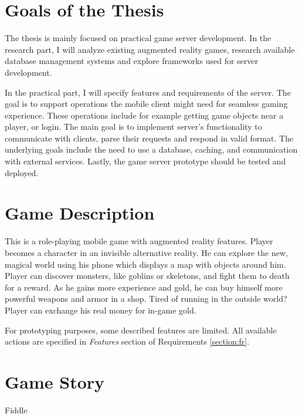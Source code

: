 \section{Goals of the Thesis}
The thesis is mainly focused on practical game server development. In the research part, I will analyze existing augmented reality games, research available database management systems and explore frameworks used for server development.

In the practical part, I will specify features and requirements of the server. The goal is to support operations the mobile client might need for seamless gaming experience. These operations include for example getting game objects near a player, or login. The main goal is to implement server's functionality to communicate with clients, parse their requests and respond in valid format. The underlying goals include the need to use a database, caching, and communication with external services. Lastly, the game server prototype should be tested and deployed.	

\section{Game Description}
This is a role-playing mobile game with augmented reality features. Player becomes a character in an invisible alternative reality. He can explore the new, magical world using his phone which displays a map with objects around him. Player can discover monsters, like goblins or skeletons, and fight them to death for a reward. As he gains more experience and gold, he can buy himself more powerful weapons and armor in a shop. Tired of running in the outside world? Player can exchange his real money for in-game gold.

For prototyping purposes, some described features are limited. All available actions are specified in \textit{Features} section of Requirements \ref{section:fr}.

\section{Game Story}
Fiddle